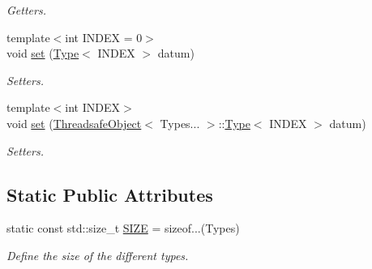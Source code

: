 \begin{DoxyCompactItemize}
\begin{DoxyCompactList}\small\item\em Getters. \end{DoxyCompactList}\item 
{\footnotesize template$<$int I\+N\+D\+EX = 0$>$ }\\void \hyperlink{classreal__time__tools_1_1ThreadsafeObject_a57fe7089b589f905a13127c50ceb2dae}{set} (\hyperlink{classreal__time__tools_1_1ThreadsafeObject_aa40f755aebba0692a345e2b807d781ed}{Type}$<$ I\+N\+D\+EX $>$ datum)
\begin{DoxyCompactList}\small\item\em Setters. \end{DoxyCompactList}\item 
{\footnotesize template$<$int I\+N\+D\+EX$>$ }\\void \hyperlink{classreal__time__tools_1_1ThreadsafeObject_af476dc729bd9c02387d5fcf15e513448}{set} (\hyperlink{classreal__time__tools_1_1ThreadsafeObject}{Threadsafe\+Object}$<$ Types... $>$\+::\hyperlink{classreal__time__tools_1_1ThreadsafeObject_aa40f755aebba0692a345e2b807d781ed}{Type}$<$ I\+N\+D\+EX $>$ datum)
\begin{DoxyCompactList}\small\item\em Setters. \end{DoxyCompactList}\end{DoxyCompactItemize}
\subsection*{Static Public Attributes}
\begin{DoxyCompactItemize}
\item 
static const std\+::size\+\_\+t \hyperlink{classreal__time__tools_1_1ThreadsafeObject_af05c02b66f0b75ea12cde9274bc2a97d}{S\+I\+ZE} = sizeof...(Types)\hypertarget{classreal__time__tools_1_1ThreadsafeObject_af05c02b66f0b75ea12cde9274bc2a97d}{}\label{classreal__time__tools_1_1ThreadsafeObject_af05c02b66f0b75ea12cde9274bc2a97d}

\begin{DoxyCompactList}\small\item\em Define the size of the different types. \end{DoxyCompactList}\end{DoxyCompactItemize}

